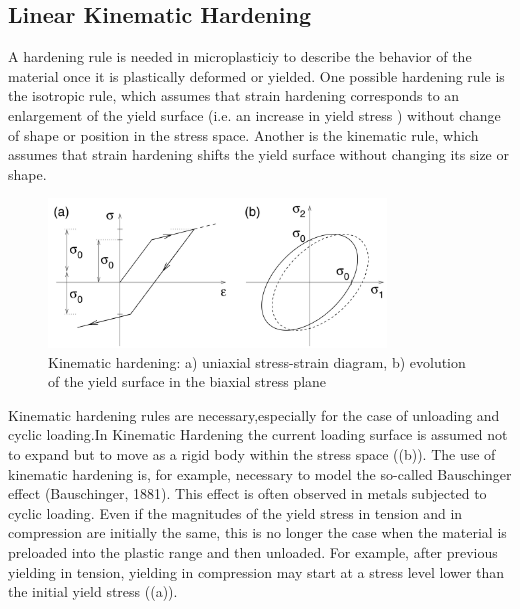 \subsection{Linear Kinematic Hardening}
A hardening rule is needed in microplasticiy to
describe the behavior of the
material once it is plastically
deformed or yielded. One possible hardening rule is the
isotropic rule, which assumes
that strain hardening corresponds
to an enlargement of the yield
surface (i.e. an increase in  yield stress )
without change of shape or
position in the stress space. Another is the kinematic rule,
which assumes that strain
hardening shifts the yield surface
without changing its size or shape.
\begin{figure}[h!]
	\centering
	\includegraphics[width=0.8\textwidth]{figures//kinhard.png} 
	\caption{Kinematic hardening: a) uniaxial stress-strain diagram, b) evolution of the
		yield surface in the biaxial stress plane}
	\label{kinhard}
\end{figure}
Kinematic hardening rules are necessary,especially for the case of unloading and cyclic loading.In Kinematic Hardening the current loading surface is assumed not to expand but to move as a rigid body
within the stress space ((b)). The use
of kinematic hardening is, for example, necessary to model the so-called Bauschinger
effect (Bauschinger, 1881). This effect is often observed in metals subjected to cyclic
loading. Even if the magnitudes of the yield stress in tension and in compression
are initially the same, this is no longer the case when the material is preloaded into
the plastic range and then unloaded. For example, after previous yielding in tension,
yielding in compression may start at a stress level lower than the initial yield stress
((a)).

